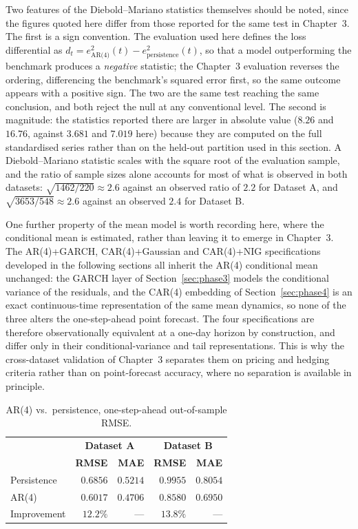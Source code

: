 Two features of the Diebold--Mariano statistics themselves should be noted, since the figures quoted here differ from those reported for the same test in Chapter~3. The first is a sign convention. The evaluation used here defines the loss differential as $d_t = e^2_{\text{AR(4)}}(t) - e^2_{\text{persistence}}(t)$, so that a model outperforming the benchmark produces a \emph{negative} statistic; the Chapter~3 evaluation reverses the ordering, differencing the benchmark's squared error first, so the same outcome appears with a positive sign. The two are the same test reaching the same conclusion, and both reject the null at any conventional level. The second is magnitude: the statistics reported there are larger in absolute value ($8.26$ and $16.76$, against $3.681$ and $7.019$ here) because they are computed on the full standardised series rather than on the held-out partition used in this section. A Diebold--Mariano statistic scales with the square root of the evaluation sample, and the ratio of sample sizes alone accounts for most of what is observed in both datasets: $\sqrt{1462/220} \approx 2.6$ against an observed ratio of $2.2$ for Dataset A, and $\sqrt{3653/548} \approx 2.6$ against an observed $2.4$ for Dataset B.

One further property of the mean model is worth recording here, where the conditional mean is estimated, rather than leaving it to emerge in Chapter~3. The AR(4)+GARCH, CAR(4)+Gaussian and CAR(4)+NIG specifications developed in the following sections all inherit the AR(4) conditional mean unchanged: the GARCH layer of Section~\ref{sec:phase3} models the conditional variance of the residuals, and the CAR(4) embedding of Section~\ref{sec:phase4} is an exact continuous-time representation of the same mean dynamics, so none of the three alters the one-step-ahead point forecast. The four specifications are therefore observationally equivalent at a one-day horizon by construction, and differ only in their conditional-variance and tail representations. This is why the cross-dataset validation of Chapter~3 separates them on pricing and hedging criteria rather than on point-forecast accuracy, where no separation is available in principle.

\begin{table}[htbp]
\centering
\caption{AR(4) vs.\ persistence, one-step-ahead out-of-sample RMSE.}
\label{tab:ar4-rmse}
\begin{tabular}{l r r r r}
\toprule
& \multicolumn{2}{c}{\textbf{Dataset A}} & \multicolumn{2}{c}{\textbf{Dataset B}} \\
& \textbf{RMSE} & \textbf{MAE} & \textbf{RMSE} & \textbf{MAE} \\
\midrule
Persistence & $0.6856$ & $0.5214$ & $0.9955$ & $0.8054$ \\
AR(4) & $0.6017$ & $0.4706$ & $0.8580$ & $0.6950$ \\
Improvement & $12.2\%$ & --- & $13.8\%$ & --- \\
\bottomrule
\end{tabular}
\end{table}

